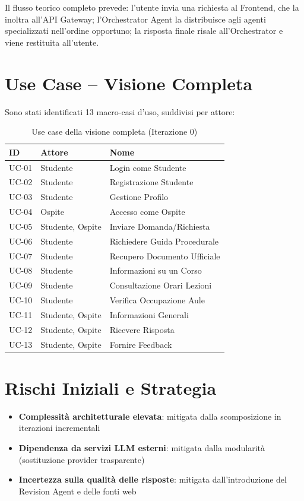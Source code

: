 \documentclass[a4paper,12pt]{report}
\begin{document}
Il flusso teorico completo prevede: l'utente invia una richiesta al Frontend, che la inoltra all'API Gateway; l'Orchestrator Agent la distribuisce agli agenti specializzati nell'ordine opportuno; la risposta finale risale all'Orchestrator e viene restituita all'utente.

\section{Use Case -- Visione Completa}

Sono stati identificati 13 macro-casi d'uso, suddivisi per attore:

\begin{table}[H]
\centering
\small
\begin{tabularx}{\textwidth}{l l X}
\toprule
\textbf{ID} & \textbf{Attore} & \textbf{Nome} \\
\midrule
UC-01 & Studente & Login come Studente \\
UC-02 & Studente & Registrazione Studente \\
UC-03 & Studente & Gestione Profilo \\
UC-04 & Ospite & Accesso come Ospite \\
UC-05 & Studente, Ospite & Inviare Domanda/Richiesta \\
UC-06 & Studente & Richiedere Guida Procedurale \\
UC-07 & Studente & Recupero Documento Ufficiale \\
UC-08 & Studente & Informazioni su un Corso \\
UC-09 & Studente & Consultazione Orari Lezioni \\
UC-10 & Studente & Verifica Occupazione Aule \\
UC-11 & Studente, Ospite & Informazioni Generali \\
UC-12 & Studente, Ospite & Ricevere Risposta \\
UC-13 & Studente, Ospite & Fornire Feedback \\
\bottomrule
\end{tabularx}
\caption{Use case della visione completa (Iterazione 0)}
\end{table}

\section{Rischi Iniziali e Strategia}

\begin{itemize}
    \item \textbf{Complessità architetturale elevata}: mitigata dalla scomposizione in iterazioni incrementali
    \item \textbf{Dipendenza da servizi LLM esterni}: mitigata dalla modularità (sostituzione provider trasparente)
    \item \textbf{Incertezza sulla qualità delle risposte}: mitigata dall'introduzione del Revision Agent e delle fonti web
\end{itemize}
\end{document}
